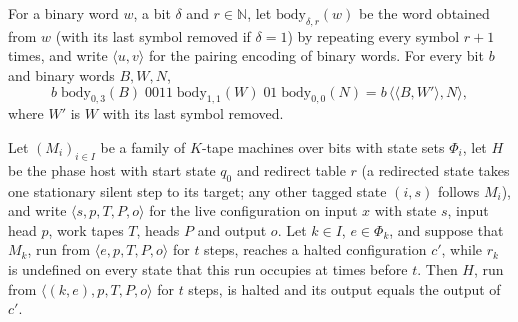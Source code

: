 \begin{theorem}
\label{Turing.NTimeDiag.qy_writer_word}
\leanok
{}
For a binary word $w$, a bit $\delta$ and $r \in \mathbb{N}$, let $\mathrm{body}_{\delta,r}(w)$ be
the word obtained from $w$ (with its last symbol removed if $\delta = 1$) by repeating every symbol
$r + 1$ times, and write $\langle u, v\rangle$ for the pairing encoding of binary words. For every
bit $b$ and binary words $B, W, N$, \[
b\;\mathrm{body}_{0,3}(B)\;0011\;\mathrm{body}_{1,1}(W)\;01\;\mathrm{body}_{0,0}(N) =
b\,\langle\langle B, W'\rangle, N\rangle, \] where $W'$ is $W$ with its last symbol removed.
\end{theorem}

\begin{theorem}
\label{Turing.NTimeDiag.qy_hosted_halt}
\leanok
{}
Let $(M_i)_{i \in I}$ be a family of $K$-tape machines over bits with state sets $\Phi_i$, let $H$
be the phase host with start state $q_0$ and redirect table $r$ (a redirected state takes one
stationary silent step to its target; any other tagged state $(i, s)$ follows $M_i$), and write
$\langle s, p, T, P, o\rangle$ for the live configuration on input $x$ with state $s$, input head
$p$, work tapes $T$, heads $P$ and output $o$. Let $k \in I$, $e \in \Phi_k$, and suppose that
$M_k$, run from $\langle e, p, T, P, o\rangle$ for $t$ steps, reaches a halted configuration $c'$,
while $r_k$ is undefined on every state that this run occupies at times before $t$. Then $H$, run
from $\langle (k, e), p, T, P, o\rangle$ for $t$ steps, is halted and its output equals the output
of $c'$.
\end{theorem}

